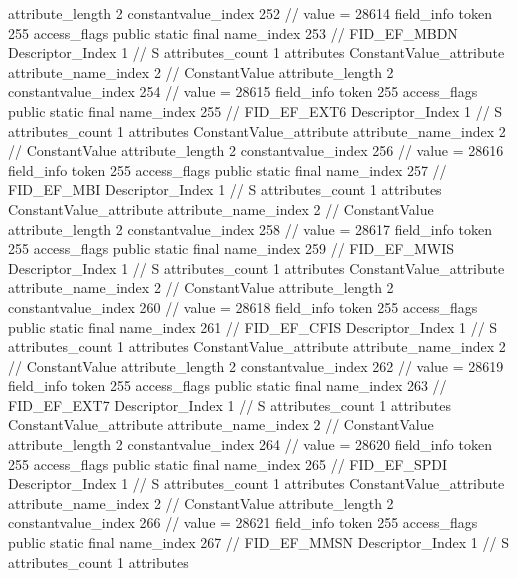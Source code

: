 {{{{{{{					attribute_length	2
					constantvalue_index	252		// value = 28614
				}
				}
			}
			field_info {
				token	255
				access_flags	public static final
				name_index	253		// FID_EF_MBDN
				Descriptor_Index	1		// S
				attributes_count	1
				attributes {
				ConstantValue_attribute {
					attribute_name_index	2		// ConstantValue
					attribute_length	2
					constantvalue_index	254		// value = 28615
				}
				}
			}
			field_info {
				token	255
				access_flags	public static final
				name_index	255		// FID_EF_EXT6
				Descriptor_Index	1		// S
				attributes_count	1
				attributes {
				ConstantValue_attribute {
					attribute_name_index	2		// ConstantValue
					attribute_length	2
					constantvalue_index	256		// value = 28616
				}
				}
			}
			field_info {
				token	255
				access_flags	public static final
				name_index	257		// FID_EF_MBI
				Descriptor_Index	1		// S
				attributes_count	1
				attributes {
				ConstantValue_attribute {
					attribute_name_index	2		// ConstantValue
					attribute_length	2
					constantvalue_index	258		// value = 28617
				}
				}
			}
			field_info {
				token	255
				access_flags	public static final
				name_index	259		// FID_EF_MWIS
				Descriptor_Index	1		// S
				attributes_count	1
				attributes {
				ConstantValue_attribute {
					attribute_name_index	2		// ConstantValue
					attribute_length	2
					constantvalue_index	260		// value = 28618
				}
				}
			}
			field_info {
				token	255
				access_flags	public static final
				name_index	261		// FID_EF_CFIS
				Descriptor_Index	1		// S
				attributes_count	1
				attributes {
				ConstantValue_attribute {
					attribute_name_index	2		// ConstantValue
					attribute_length	2
					constantvalue_index	262		// value = 28619
				}
				}
			}
			field_info {
				token	255
				access_flags	public static final
				name_index	263		// FID_EF_EXT7
				Descriptor_Index	1		// S
				attributes_count	1
				attributes {
				ConstantValue_attribute {
					attribute_name_index	2		// ConstantValue
					attribute_length	2
					constantvalue_index	264		// value = 28620
				}
				}
			}
			field_info {
				token	255
				access_flags	public static final
				name_index	265		// FID_EF_SPDI
				Descriptor_Index	1		// S
				attributes_count	1
				attributes {
				ConstantValue_attribute {
					attribute_name_index	2		// ConstantValue
					attribute_length	2
					constantvalue_index	266		// value = 28621
				}
				}
			}
			field_info {
				token	255
				access_flags	public static final
				name_index	267		// FID_EF_MMSN
				Descriptor_Index	1		// S
				attributes_count	1
				attributes {
}}}}}}
